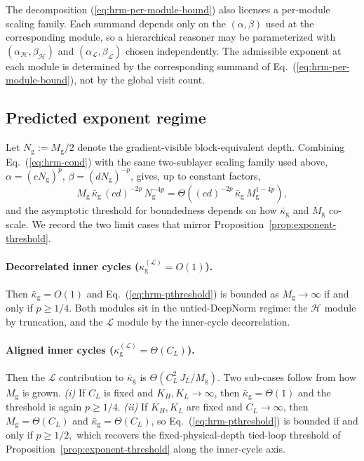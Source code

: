 \documentclass[11pt]{airesearch}
\begin{document}
The decomposition (\ref{eq:hrm-per-module-bound}) also licenses a per-module
scaling family. Each summand depends only on the $(\alpha,\beta)$ used at
the corresponding module, so a hierarchical reasoner may be parameterized
with $(\alpha_{\mathcal{H}},\beta_{\mathcal{H}})$ and
$(\alpha_{\mathcal{L}},\beta_{\mathcal{L}})$ chosen independently. The
admissible exponent at each module is determined by the corresponding
summand of Eq.~(\ref{eq:hrm-per-module-bound}), not by the global visit
count.

\subsection{Predicted exponent regime}
\label{sec:hrm:exp}

Let $N_{\mathrm{g}}:=M_{\mathrm{g}}/2$ denote the gradient-visible
block-equivalent depth. Combining Eq.~(\ref{eq:hrm-cond}) with the same
two-sublayer scaling family used above, $\alpha=(c N_{\mathrm{g}})^p$, $\beta=(d N_{\mathrm{g}})^{-p}$, gives, up to constant factors,
\begin{equation}
  M_{\mathrm{g}}\,\bar\kappa_{\mathrm{g}}\,
  (cd)^{-2p}\,N_{\mathrm{g}}^{-4p}
  =
  \Theta\!\left((cd)^{-2p}\,\bar\kappa_{\mathrm{g}}\,M_{\mathrm{g}}^{1-4p}\right),
  \label{eq:hrm-pthreshold}
\end{equation}
and the asymptotic threshold for boundedness depends on how
$\bar\kappa_{\mathrm{g}}$ and $M_{\mathrm{g}}$ co-scale. We record the two
limit cases that mirror Proposition~\ref{prop:exponent-threshold}.

\paragraph{Decorrelated inner cycles
($\kappa_{\mathrm{g}}^{(\mathcal{L})}=O(1)$).}
Then $\bar\kappa_{\mathrm{g}}=O(1)$ and Eq.~(\ref{eq:hrm-pthreshold}) is
bounded as $M_{\mathrm{g}}\to\infty$ if and only if
$  p \ge 1/4.$
Both modules sit in the untied-DeepNorm regime: the $\mathcal{H}$ module by
truncation, and the $\mathcal{L}$ module by the inner-cycle decorrelation.

\paragraph{Aligned inner cycles
($\kappa_{\mathrm{g}}^{(\mathcal{L})}=\Theta(C_L)$).}
Then the $\mathcal{L}$ contribution to $\bar\kappa_{\mathrm{g}}$ is $\Theta(C_L^2\,J_L/M_{\mathrm{g}})$. Two
sub-cases follow from how $M_{\mathrm{g}}$ is grown.
\emph{(i)} If $C_L$ is fixed and $K_H,K_L\to\infty$, then
$\bar\kappa_{\mathrm{g}}=\Theta(1)$ and the threshold is again
$p\ge 1/4$.
\emph{(ii)} If $K_H,K_L$ are fixed and $C_L\to\infty$, then
$M_{\mathrm{g}}=\Theta(C_L)$ and
$\bar\kappa_{\mathrm{g}}=\Theta(C_L)$, so
Eq.~(\ref{eq:hrm-pthreshold}) is bounded if and only if
$  p \ge 1/2,$
which recovers the fixed-physical-depth tied-loop threshold of
Proposition~\ref{prop:exponent-threshold} along the inner-cycle axis.
\end{document}
